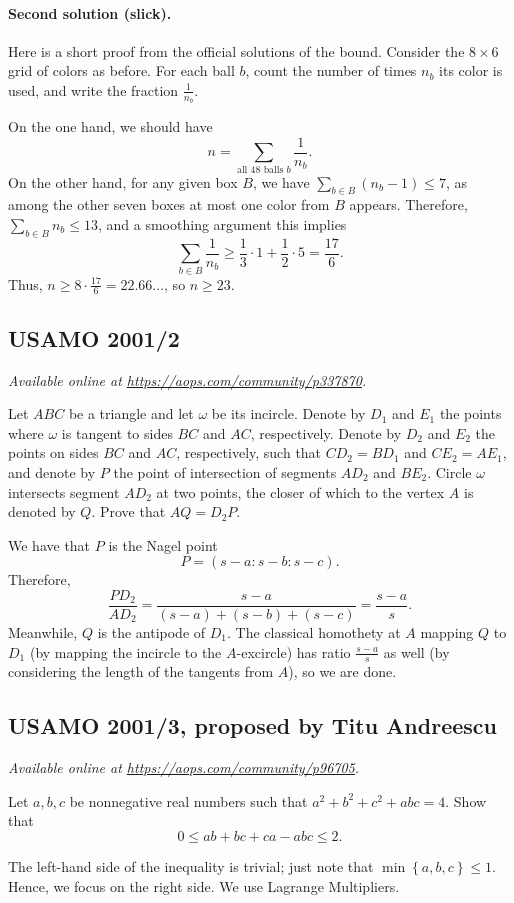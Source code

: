 \documentclass[11pt]{scrartcl}
\begin{document}
\paragraph{Second solution (slick).}
Here is a short proof from the official solutions of the bound.
Consider the $8 \times 6$ grid of colors as before.
For each ball $b$, count the number of times $n_b$ its color is used,
and write the fraction $\frac{1}{n_b}$.

On the one hand, we should have
\[ n = \sum_{\text{all $48$ balls $b$}} \frac{1}{n_b}. \]
On the other hand, for any given box $B$, we have
$\sum_{b \in B} (n_b-1) \le 7$, as among the other seven boxes
at most one color from $B$ appears.
Therefore, $\sum_{b \in B} n_b \le 13$,
and a smoothing argument this implies
\[ \sum_{b \in B} \frac{1}{n_b} \ge \frac13 \cdot 1 + \frac12 \cdot 5
  = \frac{17}{6}. \]
Thus, $n \ge 8 \cdot \frac{17}{6} = 22.66\dots$, so $n \ge 23$.
\pagebreak

\subsection{USAMO 2001/2}
\textsl{Available online at \url{https://aops.com/community/p337870}.}
\begin{mdframed}[style=mdpurplebox,frametitle={Problem statement}]
Let $ABC$ be a triangle and let $\omega$ be its incircle.
Denote by $D_1$ and $E_1$ the points where $\omega$
is tangent to sides $BC$ and $AC$, respectively.
Denote by $D_2$ and $E_2$ the points on sides $BC$ and $AC$,
respectively, such that $CD_2=BD_1$ and $CE_2=AE_1$,
and denote by $P$ the point of intersection of segments $AD_2$ and $BE_2$.
Circle $\omega$ intersects segment $AD_2$ at two points,
the closer of which to the vertex $A$ is denoted by $Q$.
Prove that $AQ=D_2P$.
\end{mdframed}
We have that $P$ is the Nagel point
\[ P = \left( s-a : s-b : s-c \right). \]
Therefore,
\[ \frac{PD_2}{AD_2} = \frac{s-a}{(s-a)+(s-b)+(s-c)} = \frac{s-a}{s}. \]
Meanwhile, $Q$ is the antipode of $D_1$.
The classical homothety at $A$ mapping $Q$ to $D_1$
(by mapping the incircle to the $A$-excircle)
has ratio $\frac{s-a}{s}$ as well
(by considering the length of the tangents from $A$),
so we are done.
\pagebreak

\subsection{USAMO 2001/3, proposed by Titu Andreescu}
\textsl{Available online at \url{https://aops.com/community/p96705}.}
\begin{mdframed}[style=mdpurplebox,frametitle={Problem statement}]
Let $a, b, c$ be nonnegative real numbers
such that $a^2+b^2+c^2 + abc = 4$.
Show that \[ 0 \le ab + bc + ca - abc \le 2. \]
\end{mdframed}
The left-hand side of the inequality is trivial;
just note that $\min \left\{ a,b,c \right\} \le 1$.
Hence, we focus on the right side.
We use Lagrange Multipliers.
\end{document}
